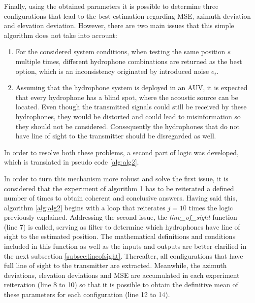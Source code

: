 Finally, using the obtained parameters it is possible to determine three configurations that lead to the best estimation regarding MSE, azimuth deviation and elevation deviation. However, there are two main issues that this simple algorithm does not take into account:

\begin{enumerate}
	
	\item  For the considered system conditions, when testing the same position $s$ multiple times, different hydrophone combinations are returned as the best option, which is an inconsistency originated by introduced noise $e_i$.
	
	\item Assuming that the hydrophone system is deployed in an AUV, it is expected that every hydrophone has a blind spot, where the acoustic source can be located. Even though the transmitted signals could still be received by these hydrophones, they would be distorted and could lead to misinformation so they should not be considered. Consequently the hydrophones that do not have line of sight to the transmitter should be disregarded as well. 
	
\end{enumerate}

In order to resolve both these problems, a second part of logic was developed, which is translated in pseudo code \ref{alg:alg2}.

In order to turn this mechanism more robust and solve the first issue, it is considered that the experiment of algorithm 1 has to be reiterated a defined number of times to obtain coherent and conclusive answers. Having said this, algorithm \ref{alg:alg2} begins with a loop that reiterates $j = 10$ times the logic previously explained. Addressing the second issue, the \textit{line\_of\_sight} function (line 7) is called, serving as filter to determine which hydrophones have line of sight to the estimated position. The mathematical definitions and conditions included in this function as well as the inputs and outputs are better clarified in the next subsection \ref{subsec:lineofsight}. Thereafter, all configurations that have full line of sight to the transmitter are extracted. Meanwhile, the azimuth deviations, elevation deviations and MSE are accumulated in each experiment reiteration (line 8 to 10) so that it is possible to obtain the definitive mean of these parameters for each configuration (line 12 to 14). 

